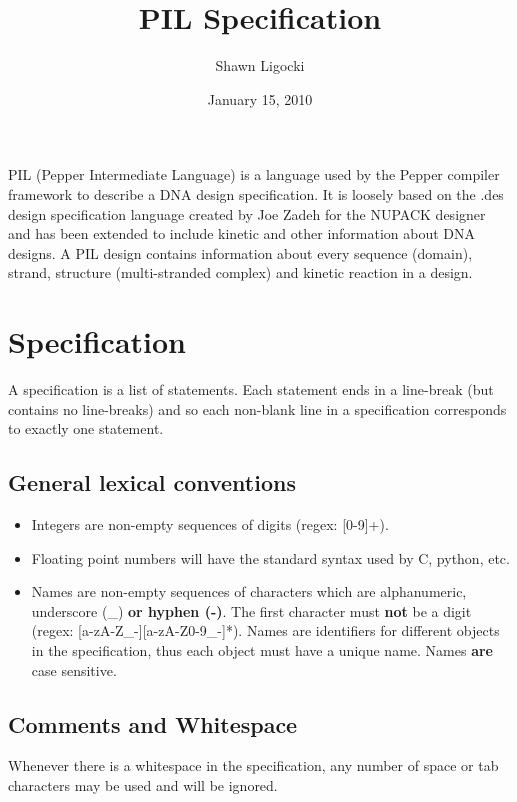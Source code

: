 \documentclass{article}
\begin{document}
\title{PIL Specification}
\author{Shawn Ligocki}
\date{January 15, 2010}
\maketitle

PIL (Pepper Intermediate Language) is a language used by the Pepper
compiler framework to describe a DNA design specification. It is loosely
based on the .des design specification language created by Joe Zadeh
for the NUPACK designer and has been extended to include kinetic and
other information about DNA designs. A PIL design contains information
about every sequence (domain), strand, structure (multi-stranded complex)
and kinetic reaction in a design.


\section{Specification}

A specification is a list of statements. Each statement ends in a
line-break (but contains no line-breaks) and so each non-blank line
in a specification corresponds to exactly one statement.


\subsection{General lexical conventions}
\begin{itemize}
\item Integers are non-empty sequences of digits (regex: {[}0-9{]}+).
\item Floating point numbers will have the standard syntax used by C, python,
etc.
\item Names are non-empty sequences of characters which are alphanumeric,
underscore (\_) \textbf{or hyphen (-)}. The first character must \textbf{not}
be a digit (regex: {[}a-zA-Z\_-{]}{[}a-zA-Z0-9\_-{]}{*}). Names are
identifiers for different objects in the specification, thus each
object must have a unique name. Names \textbf{are}\textbf{\emph{ }}case
sensitive.
\end{itemize}

\subsection{Comments and Whitespace}

Whenever there is a whitespace in the specification, any number of
space or tab characters may be used and will be ignored.
\end{document}
